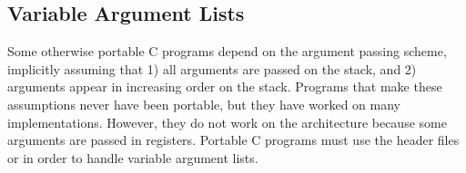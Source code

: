 \subsection{Variable Argument Lists}

Some otherwise portable C programs depend on the argument passing
scheme, implicitly assuming that 1) all arguments are passed on the
stack, and 2) arguments appear in increasing order on the stack.
Programs that make these assumptions never have been portable, but
they have worked on many implementations. However, they do not work on
the \xARCH architecture because some arguments are passed in
registers.  Portable C programs must use the header files
 or  in order to handle variable
argument lists.

